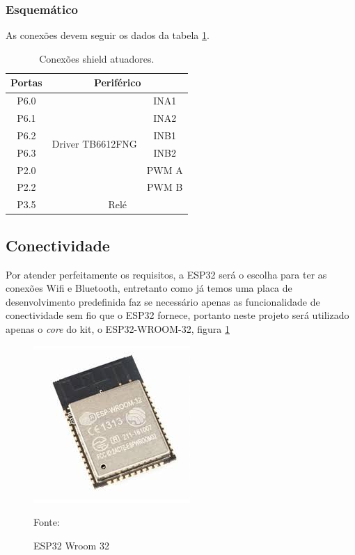 \subsubsection{Esquemático}

As conexões devem seguir os dados da tabela \ref{tab:atuadores}.

\begin{table}[h!]
\centering
\begin{tabular}{|c|c|c|}
\hline
Portas & \multicolumn{2}{c|}{Periférico}           \\ \hline
P6.0   & \multirow{6}{*}{Driver TB6612FNG} & INA1  \\ \cline{1-1} \cline{3-3} 
P6.1   &                                   & INA2  \\ \cline{1-1} \cline{3-3} 
P6.2   &                                   & INB1  \\ \cline{1-1} \cline{3-3} 
P6.3   &                                   & INB2  \\ \cline{1-1} \cline{3-3} 
P2.0   &                                   & PWM A \\ \cline{1-1} \cline{3-3} 
P2.2   &                                   & PWM B \\ \hline
P3.5   & \multicolumn{2}{c|}{Relé}                 \\ \hline
\end{tabular}
\caption{Conexões shield atuadores.}
\label{tab:atuadores}
\end{table}

\subsection{Conectividade}

Por atender perfeitamente os requisitos, a ESP32 será o escolha para ter as conexões Wifi e Bluetooth, entretanto como já temos uma placa de desenvolvimento predefinida faz se necessário apenas as funcionalidade de conectividade sem fio que o ESP32 fornece, portanto neste projeto será utilizado apenas o \textit{core} do kit, o ESP32-WROOM-32, figura \ref{fig:esp32}

\begin{figure}[h!]
  \centering
    \includegraphics[width=.4\textwidth]{figuras/esp32.jpg}
    \caption{ESP32 Wroom 32} Fonte: \cite{Indiamart2019}
    \label{fig:esp32}
\end{figure}

